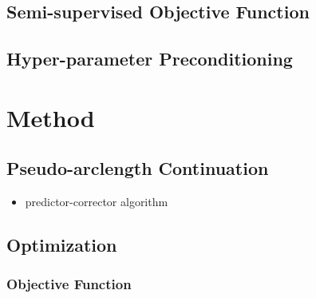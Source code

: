 \documentclass{article}[12pt]
\numberwithin{equation}{section}
\begin{document}
\subsection{Semi-supervised Objective Function}


\subsection{Hyper-parameter Preconditioning}


\section{Method}

\subsection{Pseudo-arclength Continuation}
\label{sec:continuation}

\begin{itemize}
    \item predictor-corrector algorithm
    \end{itemize}

\subsection{Optimization}

\subsubsection{Objective Function}
\label{sec:objective-function}
\end{document}
